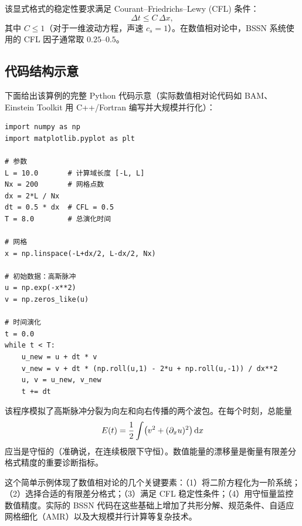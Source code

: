 \begin{note}[CFL 条件]
该显式格式的稳定性要求满足 Courant--Friedrichs--Lewy (CFL) 条件：
\begin{equation}
    \Delta t \leq C \,\Delta x,
    \label{eq:CFL}
\end{equation}
其中 $C \leq 1$（对于一维波动方程，声速 $c_s=1$）。在数值相对论中，BSSN 系统使用的 CFL 因子通常取 $0.25$--$0.5$。
\end{note}

\subsection{代码结构示意}

下面给出该算例的完整 Python 代码示意（实际数值相对论代码如 BAM、Einstein Toolkit 用 C++/Fortran 编写并大规模并行化）：

\begin{verbatim}
import numpy as np
import matplotlib.pyplot as plt

# 参数
L = 10.0       # 计算域长度 [-L, L]
Nx = 200       # 网格点数
dx = 2*L / Nx
dt = 0.5 * dx  # CFL = 0.5
T = 8.0        # 总演化时间

# 网格
x = np.linspace(-L+dx/2, L-dx/2, Nx)

# 初始数据：高斯脉冲
u = np.exp(-x**2)
v = np.zeros_like(u)

# 时间演化
t = 0.0
while t < T:
    u_new = u + dt * v
    v_new = v + dt * (np.roll(u,1) - 2*u + np.roll(u,-1)) / dx**2
    u, v = u_new, v_new
    t += dt
\end{verbatim}

\begin{example}[结果分析]
该程序模拟了高斯脉冲分裂为向左和向右传播的两个波包。在每个时刻，总能量
\begin{equation}
    E(t) = \frac{1}{2}\int \bigl(v^2 + (\partial_x u)^2\bigr)\,\dd x
\end{equation}
应当是守恒的（准确说，在连续极限下守恒）。数值能量的漂移量是衡量有限差分格式精度的重要诊断指标。
\end{example}

这个简单示例体现了数值相对论的几个关键要素：（1）将二阶方程化为一阶系统；（2）选择合适的有限差分格式；（3）满足 CFL 稳定性条件；（4）用守恒量监控数值精度。实际的 BSSN 代码在这些基础上增加了共形分解、规范条件、自适应网格细化（AMR）以及大规模并行计算等复杂技术。


